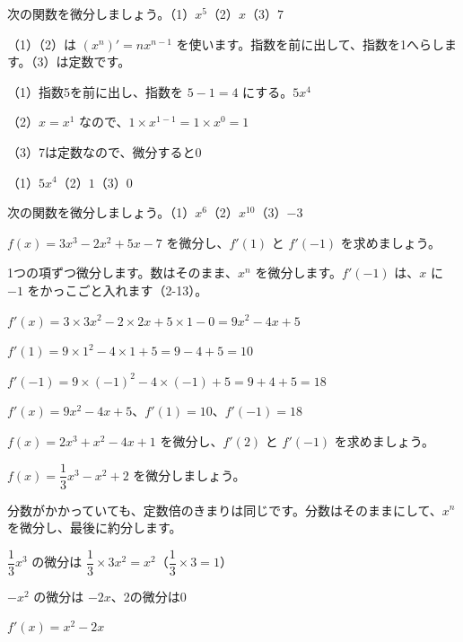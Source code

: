 \begin{reidai}[$x^n$ と定数の微分]
次の関数を微分しましょう。\quad（1）$x^5$\quad（2）$x$\quad（3）$7$\par
\kangaekata（1）（2）は $(x^n)'=nx^{n-1}$ を使います。指数を前に出して、指数を1へらします。（3）は定数です。\par
\shiki（1）指数5を前に出し、指数を $5-1=4$ にする。$5x^4$\par
\hspace*{2.6\zw}（2）$x=x^1$ なので、$1\times x^{1-1}=1\times x^0=1$\par
\hspace*{2.6\zw}（3）7は定数なので、微分すると0\par
\kotae （1）$5x^4$\quad（2）$1$\quad（3）$0$
\end{reidai}

\begin{jibun}
次の関数を微分しましょう。\quad（1）$x^6$\quad（2）$x^{10}$\quad（3）$-3$
\end{jibun}

\begin{reidai}[多項式の微分と微分係数]
$f(x)=3x^3-2x^2+5x-7$ を微分し、$f'(1)$ と $f'(-1)$ を求めましょう。\par
\kangaekata 1つの項ずつ微分します。数はそのまま、$x^n$ を微分します。$f'(-1)$ は、$x$ に $-1$ をかっこごと入れます（2-13）。\par
\shiki $f'(x)=3\times3x^2-2\times2x+5\times1-0=9x^2-4x+5$\par
\hspace*{2.6\zw}$f'(1)=9\times1^2-4\times1+5=9-4+5=10$\par
\hspace*{2.6\zw}$f'(-1)=9\times(-1)^2-4\times(-1)+5=9+4+5=18$\par
\kotae $f'(x)=9x^2-4x+5$、$f'(1)=10$、$f'(-1)=18$
\end{reidai}

\begin{jibun}
$f(x)=2x^3+x^2-4x+1$ を微分し、$f'(2)$ と $f'(-1)$ を求めましょう。
\end{jibun}

\begin{reidai}[分数の係数がある多項式]
$f(x)=\dfrac{1}{3}x^3-x^2+2$ を微分しましょう。\par
\kangaekata 分数がかかっていても、定数倍のきまりは同じです。分数はそのままにして、$x^n$ を微分し、最後に約分します。\par
\shiki $\dfrac{1}{3}x^3$ の微分は $\dfrac{1}{3}\times3x^2=x^2$（$\dfrac{1}{3}\times3=1$）\par
\hspace*{2.6\zw}$-x^2$ の微分は $-2x$、2の微分は0\par
\kotae $f'(x)=x^2-2x$
\end{reidai}

